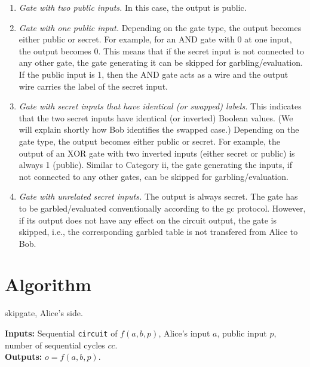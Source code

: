 \begin{enumerate}[label=\roman*]
  \item \textit{Gate with two public inputs.}
    In this case, the output is public.
  \item \textit{Gate with one public input.}
  	Depending on the gate type, the output becomes either public or secret.
  	For example, for an AND gate with 0 at one input, the output becomes 0.
  	This means that if the secret input is not connected to any other gate, the gate generating it can be skipped for garbling/evaluation.
  	If the public input is 1, then the AND gate acts as a wire and the output wire carries the label of the secret input.
  \item \textit{Gate with secret inputs that have identical (or swapped) labels.}
    This indicates that the two secret inputs have identical (or inverted) Boolean values.
    (We will explain shortly how Bob identifies the swapped case.)
    Depending on the gate type, the output becomes either public or secret.
    For example, the output of an XOR gate with two inverted inputs (either secret or public) is always 1 (public).
  	Similar to Category ii, the gate generating the inputs, if not connected to any other gates, can be skipped for garbling/evaluation.
  \item \textit{Gate with unrelated secret inputs.}
  	The output is always secret.
  	The gate has to be garbled/evaluated conventionally according to the \acrshort{gc} protocol.
    However, if its output does not have any effect on the circuit output, the gate is skipped, i.e., the corresponding garbled table is not transfered from Alice to Bob.
\end{enumerate}

\section{Algorithm}\label{sec:skipgate-alg}

\begin{algorithm}
\caption{\gls{skipgate}, Alice's side.}\label{alg:alice}
\textbf{Inputs:} Sequential \texttt{circuit} of $f(a,b,p)$, Alice's input $a$, public input $p$, number of sequential cycles $cc$.\\
\textbf{Outputs:} $o = f(a,b,p)$.\\
\begin{algorithmic}[1]
\ENDFOR
{}
\end{algorithmic}
\end{algorithm}


